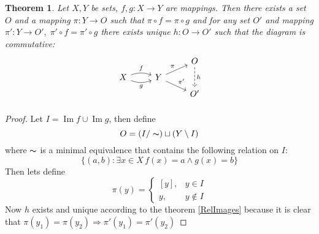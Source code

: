 \documentclass[a4paper, 12pt]{article}
\newtheorem{thm}{Theorem}
\DeclareMathOperator{\Image}{Im}
\begin{document}
\begin{thm}
    Let $X, Y$ be sets, $f, g:X\to Y$ are mappings. Then there exists
    a set $O$ and a mapping $\pi: Y\to O$ such that $\pi\circ f=\pi\circ g$
    and for any set $O'$ and mapping $\pi':Y\to O',\; \pi'\circ f = \pi'\circ g$
    there exists unique $h:O\to O'$ such that 
    the diagram is commutative: 
    \[
    \begin{tikzcd}[row sep=tiny]
        &                     &   O\arrow[dd, dashrightarrow, "h"]\\ 
        X\arrow[r, bend left=20, "f"]\arrow[r, bend right=20, "g"{below}]& Y\arrow[ur, "\pi"]\arrow[dr, "\pi'"] & \\
        &                     &   O'\\
    \end{tikzcd}
    \]
\end{thm}
\begin{proof}
    Let $I=\Image f\cup \Image g$, then define
    \[
        O=(I/\thicksim )\sqcup (Y\setminus I)
    \]
    where $\thicksim$ is a minimal equivalence that contains the following 
    relation on $I$:
    \[
        \{(a, b): \exists x\in X\,f(x)=a \land  g(x)=b\}
    \]
    Then lets define
    \[
        \pi(y)=
        \begin{cases}
            [y],&y\in I\\
            y,&y\notin I
        \end{cases}
    \]
    Now $h$ exists and unique according to the theorem \ref{RelImages}
    because it is clear that $\pi(y_1)=\pi(y_2) \Rightarrow
    \pi'(y_1)=\pi'(y_2)$
\end{proof}
\end{document}
